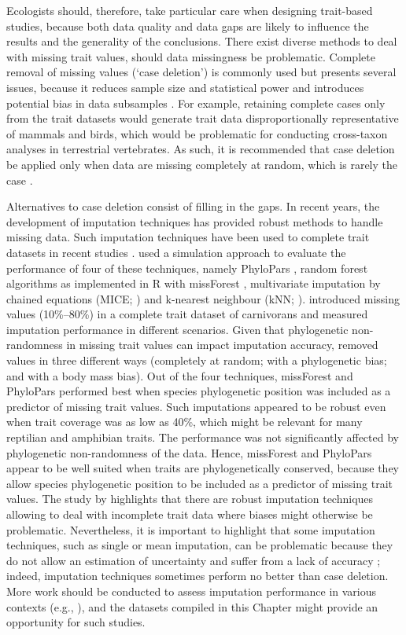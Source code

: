 Ecologists should, therefore, take particular care when designing trait-based studies, because both data quality and data gaps are likely to influence the results and the generality of the conclusions. There exist diverse methods to deal with missing trait values, should data missingness be problematic. Complete removal of missing values (`case deletion') is commonly used but presents several issues, because it reduces sample size and statistical power and introduces potential bias in data subsamples \citep{Nakagawa2008}. For example, retaining complete cases only from the trait datasets would generate trait data disproportionally representative of mammals and birds, which would be problematic for conducting cross-taxon analyses in terrestrial vertebrates. As such, it is recommended that case deletion be applied only when data are missing completely at random, which is rarely the case \citep{Peugh2004}.

Alternatives to case deletion consist of filling in the gaps. In recent years, the development of imputation techniques has provided robust methods to handle missing data. Such imputation techniques have been used to complete trait datasets in recent studies \citep{Cooke2019b}. \citet{Penone2014} used a simulation approach to evaluate the performance of four of these techniques, namely PhyloPars \citep{Bruggeman2009}, random forest algorithms as implemented in R with missForest \citep{Stekhoven2016, Stekhoven2012}, multivariate imputation by chained equations (MICE; \citet{micepackage}) and k-nearest neighbour (kNN; \citet{Troyanskaya2001}). \citet{Penone2014} introduced missing values (10\%–80\%) in a complete trait dataset of carnivorans and measured imputation performance in different scenarios. Given that phylogenetic non-randomness in missing trait values can impact imputation accuracy, \citet{Penone2014} removed values in three different ways (completely at random; with a phylogenetic bias; and with a body mass bias). Out of the four techniques, missForest and PhyloPars performed best when species phylogenetic position was included as a predictor of missing trait values. Such imputations appeared to be robust even when trait coverage was as low as 40\%, which might be relevant for many reptilian and amphibian traits. The performance was not significantly affected by phylogenetic non-randomness of the data. Hence, missForest and PhyloPars appear to be well suited when traits are phylogenetically conserved, because they allow species phylogenetic position to be included as a predictor of missing trait values. The study by \citet{Penone2014} highlights that there are robust imputation techniques allowing to deal with incomplete trait data where biases might otherwise be problematic. Nevertheless, it is important to highlight that some imputation techniques, such as single or mean imputation, can be problematic because they do not allow an estimation of uncertainty and suffer from a lack of accuracy \citep{Nakagawa2008}; indeed, imputation techniques sometimes perform no better than case deletion. More work should be conducted to assess imputation performance in various contexts (e.g., \citet{Johnson2021}), and the datasets compiled in this Chapter might provide an opportunity for such studies.

